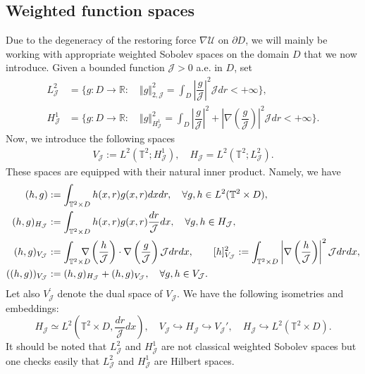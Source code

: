 \documentclass[a4paper,12pt, reqno]{amsart}
\providecommand{\U}[1]{\protect\rule{.1in}{.1in}}
\newcommand{\T}{\mathbb{T}}
\renewcommand{\U}{\mathcal{U}}
\begin{document}
\subsection{Weighted function spaces}\label{sect-funct-spaces}
Due to the degeneracy of the restoring force $\nabla \U$ on $\partial D$, we will mainly be working with appropriate weighted Sobolev spaces on the domain $D$ that we now introduce. 
Given a bounded function $\mathcal{J}> 0$ a.e. in $D$, set
\begin{align*}
    L^2_\mathcal{J}&=\{g:D \to \mathbb{R}: \quad \Vert g\Vert_{2,\mathcal{J}}^2=\int_D \left |\dfrac{g}{\mathcal{J}}\right |^2 \mathcal{J}dr<+\infty \},\\
        H^1_\mathcal{J}&=\{g:D \to \mathbb{R}: \quad \Vert g\Vert_{H_\mathcal{J}^1}^2=\int_D \left |\dfrac{g}{\mathcal{J}}\right|^2+ \left|\nabla\left(\dfrac{g}{\mathcal{J}}\right)\right|^2 \mathcal{J}dr <+\infty \}.
\end{align*}
Now,  we introduce the following spaces \begin{align*}    
V_\mathcal{J}:= L^2(\mathbb{T}^2;H^1_\mathcal{J}), \quad  H_\mathcal{J}=L^2(\mathbb{T}^2;L^2_\mathcal{J}).
\end{align*}
These spaces are 
equipped with their natural inner product. Namely, we have
\begin{align*}
(h,g)&:= \int_{\mathbb{T}^2\times D} h(x,r) g(x,r)dxdr,\quad	\forall	g,h \in L^2(\mathbb{T}^2\times D),\\
	(h,g)_{H_\mathcal{J}}&:= \int_{\mathbb{T}^2\times D} h(x,r) g(x,r)\dfrac{dr}{\mathcal{J}}dx,\quad	\forall	g,h \in H_{\mathcal{J}},\\
    (h,g)_{V_\mathcal{J}}&:= \int_{\mathbb{T}^2\times D} \hspace{-0.4cm}\nabla\left(\dfrac{h}{\mathcal{J}}\right)\cdot \nabla\left(\dfrac{g}{\mathcal{J}}\right) \mathcal{J}drdx, \qquad  [h]_{V_\mathcal{J}}^2 := \int _{\T^2 \times D}  \left|\nabla \left(\frac{h}{\mathcal{J}}\right)\right|^2\mathcal{J} drdx,  \\
    ((h,g))_{V_\mathcal{J}}&:= (h,g)_{H_\mathcal{J}}+ (h,g)_{V_\mathcal{J}},\quad	\forall	g,h \in V_\mathcal{J}.  
\end{align*} 
Let also $V^\prime_\mathcal{J}$ denote the dual space of $V_\mathcal{J}.$ We have the following isometries and embeddings: $$H_\mathcal{J}\simeq  L^2(\mathbb{T}^2\times D, \dfrac{dr}{\mathcal{J}}dx), \quad V_\mathcal{J} \hookrightarrow H_\mathcal{J} \hookrightarrow V_\mathcal{J}', \quad H_\mathcal{J}\hookrightarrow  L^2(\mathbb{T}^2\times D).$$
It should be noted that $L^2_\mathcal{J}$ and $H^1_\mathcal{J}$ are not classical weighted Sobolev spaces but one  checks easily that   $L^2_\mathcal{J}$ and $H^1_\mathcal{J}$  are Hilbert spaces.\\
\end{document}
